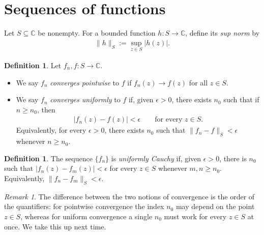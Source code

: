 \documentclass[11pt]{article}
\theoremstyle{plain}
\theoremstyle{definition}
\newtheorem{definition}[theorem]{Definition}
\theoremstyle{remark}
\newtheorem*{remark}{Remark}
\numberwithin{equation}{section}
\newcommand{\be}{\begin{eqnarray}}
\newcommand{\ee}{\end{eqnarray}}
\newcommand{\C}{\mathbb{C}}
\begin{document}
\section{Sequences of functions}
Let $S\subseteq\C$ be nonempty. For a bounded function $h:S\to\C$, define
its \emph{sup norm} by
\be
 \|h\|_S:=\sup_{z\in S}|h(z)|.
\ee

\begin{definition}
Let $f_n,f:S\to\C$.
\begin{itemize}
\item We say $f_n$ \emph{converges pointwise} to $f$ if $f_n(z)\to f(z)$
for all $z\in S$.
\item We say $f_n$ \emph{converges uniformly} to $f$ if, given
$\epsilon>0$, there exists $n_0$ such that if $n\ge n_0$, then
\be
 |f_n(z)-f(z)|<\epsilon
 \qquad\text{for every }z\in S.
\ee
Equivalently, for every $\epsilon>0$, there exists $n_0$ such that
$\|f_n-f\|_S<\epsilon$ whenever $n\ge n_0$.
\end{itemize}
\end{definition}

\begin{definition}
The sequence $\{f_n\}$ is \emph{uniformly Cauchy} if, given $\epsilon>0$,
there is $n_0$ such that $|f_n(z)-f_m(z)|<\epsilon$ for every $z\in S$
whenever $m,n\ge n_0$. Equivalently, $\|f_n-f_m\|_S<\epsilon$.
\end{definition}

\begin{remark}
The difference between the two notions of convergence is the order of the
quantifiers: for pointwise convergence the index $n_0$ may depend on the
point $z\in S$, whereas for uniform convergence a single $n_0$ must work
for every $z\in S$ at once. We take this up next time.
\end{remark}
\end{document}

